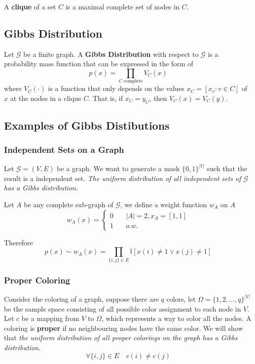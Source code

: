         \begin{definition}[Clique]\label{Def:Clique}
            A \textbf{clique} of a set $C$ is a maximal complete set of nodes in $C$.
        \end{definition}

    \subsection{Gibbs Distribution}
        \begin{definition}\label{Def:GibbsDistribution}
            Let $\mathcal{G}$ be a finite graph. A \textbf{Gibbs Distribution} with respect to $\mathcal{G}$ is a probability mass function that can be expressed in the form of
            \[ p(x) = \prod_{\text{$C$ complete}}V_C(x) \]
            where $V_C(\cdot)$ is a function that only depends on the values $x_C = [x_v:v \in C]$ of $x$ at the nodes in a clique $C$. That is, if $x_C = y_C$, then $V_C(x) = V_C(y)$.
        \end{definition}

    \subsection{Examples of Gibbs Distibutions}
        \subsubsection{Independent Sets on a Graph}
        Let $\mathcal{G}=(V,E)$ be a graph. We want to generate a mask $\{0,1\}^{|V|}$ such that the result is a independent set. \emph{The uniform distribution of all independent sets of $\mathcal{G}$ has a Gibbs distribution}.

        Let $A$ be any complete sub-graph of $\mathcal{G}$, we define a weight function $w_A$ on $A$
        \[ w_A(x) = \begin{cases}
            0 &\quad |A| = 2, x_A = [1,1]\\
            1 &\quad o.w.
        \end{cases} \] 

        Therefore
        \[ p(x) \sim w_A(x) = \prod_{\{i,j\}\in E}\mathbb{I}[x(i) \neq 1 \vee x(j) \neq 1] \]

        \subsubsection{Proper Coloring}
        Consider the coloring of a graph, suppose there are $q$ colors, let $\Omega=\{1,2,\dots,q\}^{|V|}$ be the sample space consisting of all possible color assignment to each node in $V$. Let $c$ be a mapping from $V$ to $\Omega$, which represents a way to color all the nodes. A coloring is \textbf{proper} if no neighbouring nodes have the same color. We will show that \emph{the uniform distribution of all proper colorings on the graph has a Gibbs distribution}.
        \[ \forall \{i,j\} \in E \quad c(i) \neq c(j) \]

